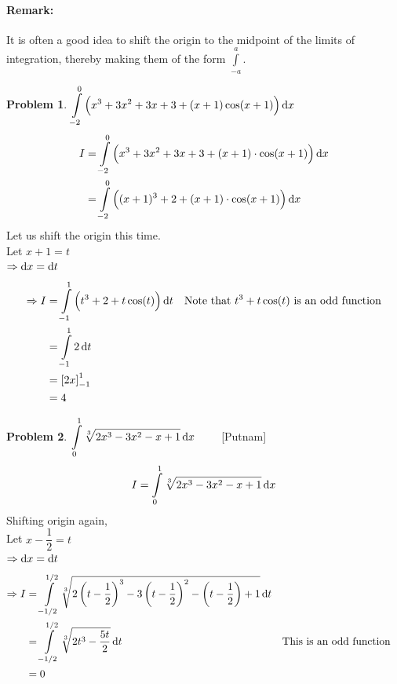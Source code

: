 \documentclass[14]{article}
\theoremstyle{definition}
\newtheorem{prob}{Problem}
\theoremstyle{case}
\begin{document}
\paragraph{Remark:} It is often a good idea to shift the origin to the midpoint of the limits of integration, thereby making them of the form $\int\limits_{-a}^a$.
\begin{prob}
$\displaystyle \int\limits_{-2}^0 \left( x^3 + 3x^2 + 3x + 3 + (x+1)\cos(x+1) \right) \dif x$\\
\begin{align*}
I &= \int\limits_{-2}^0 \left( x^3 + 3x^2 + 3x + 3 + (x+1)\cdot\cos(x+1) \right) \dif x\\
&= \int\limits_{-2}^0 \left( (x+1)^3 + 2 + (x+1)\cdot \cos(x+1) \right) \dif x
\end{align*}
Let us shift the origin this time.\\
Let $x + 1 = t$\\
$\Rightarrow \dif x = \dif t$
\begin{align*}
\Rightarrow I &= \int\limits_{-1}^1 \left( t^3 + 2 + t \cos(t) \right) \dif t && \text{Note that } t^3 + t\cos(t) \text{ is an odd function}\\
&= \int\limits_{-1}^1 2 \dif t\\
&= \left[ 2x \right]_{-1}^1\\
&= 4
\end{align*}
\end{prob}
\begin{prob}
$\displaystyle\int\limits_0^1 \sqrt[3]{2x^3 - 3x^2 - x + 1} \dif x \quad\quad$ [Putnam]
\[I = \int\limits_0^1 \sqrt[3]{2x^3 - 3x^2 - x + 1} \dif x\]
Shifting origin again,\\
Let $x - \dfrac12 = t$\\
$\Rightarrow \dif x = \dif t$
\begin{align*}
\Rightarrow I &= \int\limits_{-1/2}^{1/2} \sqrt[3]{2\left( t - \dfrac12 \right)^3 - 3 \left( t - \dfrac12 \right)^2 - \left( t - \dfrac12 \right) + 1  } \dif t\\
&= \int\limits_{-1/2}^{1/2}\sqrt[3]{2t^3 - \dfrac{5t}2} \dif t && \text{This is an odd function}\\
&= 0
\end{align*}
\end{prob}
\pagebreak
\end{document}

